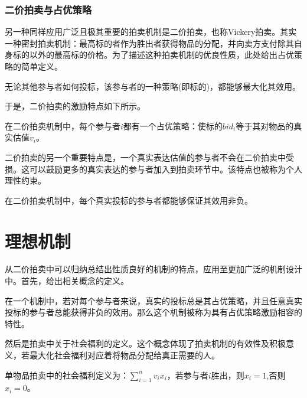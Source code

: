 \documentclass[promaster]{thesis-uestc}
\begin{document}
\subsubsection{二价拍卖与占优策略}
 另一种同样应用广泛且极其重要的拍卖机制是二价拍卖，也称Vickery拍卖。其实一种密封拍卖机制：最高标的者作为胜出者获得物品的分配，并向卖方支付除其自身标的以外的最高标的价格。为了描述这种拍卖机制的优良性质，此处给出占优策略的简单定义。
 \begin{definition}[占优策略]
     无论其他参与者如何投标，该参与者的一种策略(即标的)，都能够最大化其效用。
 \end{definition}
 于是，二价拍卖的激励特点如下所示。
 \begin{corollary}[二价拍卖中的激励]
     在二价拍卖机制中，每个参与者$i$都有一个占优策略：使标的$bid_i$等于其对物品的真实估值$v_i$。
 \end{corollary}
二价拍卖的另一个重要特点是，一个真实表达估值的参与者不会在二价拍卖中受损。这可以鼓励更多的真实表达的参与者加入到拍卖环节中。该特点也被称为个人理性约束。
\begin{corollary}[效用非负性]
    在二价拍卖机制中，每个真实投标的参与者都能够保证其效用非负。
\end{corollary}
\section{理想机制}
从二价拍卖中可以归纳总结出性质良好的机制的特点，应用至更加广泛的机制设计中。首先，给出相关概念的定义。
\begin{definition}
    在一个机制中，若对每个参与者来说，真实的投标总是其占优策略，并且任意真实投标的参与者总能获得非负的效用。那么这个机制被称为具有占优策略激励相容的特性。
\end{definition}

然后是拍卖中关于社会福利的定义。这个概念体现了拍卖机制的有效性及积极意义，若最大化社会福利对应着将物品分配给真正需要的人。
\begin{definition}[社会福利]
    单物品拍卖中的社会福利定义为：$\sum_{i=1}^{n}{v_ix_i}$，若参与者$i$胜出，则$x_i=1$,否则$x_i=0$。
\end{definition}
\end{document}
